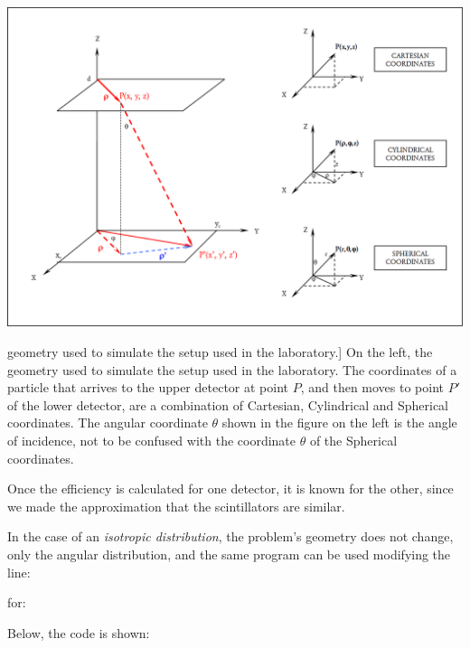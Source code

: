 	\bfi[H]
		\bc
			\includegraphics[width=.9\textwidth]{img/app2.png}
			\caption
				[geometry used to simulate the setup used in the laboratory.]
				{On the left, the geometry used to simulate the setup used in the laboratory. The coordinates of a particle that arrives to the upper detector at point $P$, and then moves to point $P'$ of the lower detector, are a combination of Cartesian, Cylindrical and Spherical coordinates. The angular coordinate $\theta$ shown in the figure on the left is the angle of incidence, not to be confused with the coordinate $\theta$ of the Spherical coordinates.}\label{fig:app2}
		\ec
	\efi

Once the efficiency is calculated for one detector, it is known for the other, since we made the approximation that the scintillators are similar.

In the case of an \textit{isotropic distribution}, the problem's geometry does not change, only the angular distribution, and the same program can be used modifying the line:
	


for:



Below, the code is shown:



